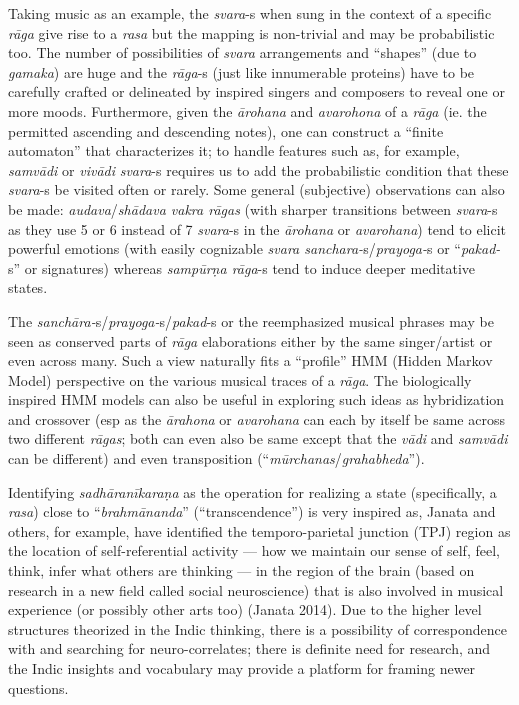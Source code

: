 Taking music as an example, the \textsl{svara}-s when sung in the context of a specific \textsl{rāga} give rise to a \textsl{rasa} but the mapping is non-trivial and may be probabilistic too. The number of possibilities of \textsl{svara} arrangements and “shapes” (due to \textsl{gamaka}) are huge and the \textsl{rāga}-s (just like innumerable proteins) have to be carefully crafted or delineated by inspired singers and composers to reveal one or more moods. Furthermore, given the \textsl{ārohana} and \textsl{avarohona} of a \textsl{rāga} (ie. the permitted ascending and descending notes), one can construct a “finite automaton” that characterizes it; to handle features such as, for example, \textsl{samvādi} or \textsl{vivādi} \textsl{svara}-s requires us to add the probabilistic condition that these \textsl{svara}-s be visited often or rarely. Some general (subjective) observations can also be made: \textsl{audava}/\textsl{shādava vakra rāgas} (with sharper transitions between \textsl{svara}-s as they use 5 or 6 instead of 7 \textsl{svara}-s in the \textsl{ārohana} or \textsl{avarohana}) tend to elicit powerful emotions (with easily cognizable \textsl{svara sanchara-}s/\textsl{prayoga-}s or “\textsl{pakad-}s” or signatures) whereas \textsl{sampūrṇa rāga}-s tend to induce deeper meditative states.

The \textsl{sanchāra-}s/\textsl{prayoga-}s/\textsl{pakad}-s or the reemphasized musical phrases may be seen as conserved parts of \textsl{rāga} elaborations either by the same singer/artist or even across many. Such a view naturally fits a “profile” HMM (Hidden Markov Model) perspective on the various musical traces of a \textsl{rāga}. The biologically inspired HMM models can also be useful in exploring such ideas as hybridization and crossover (esp as the \textsl{ārahona} or \textsl{avarohana} can each by itself be same across two different \textsl{rāgas}; both can even also be same except that the \textsl{vādi} and \textsl{samvādi} can be different) and even transposition (“\textsl{mūrchanas}/\textsl{grahabheda}”).

Identifying \textsl{sadhāranīkaraṇa} as the operation for realizing a state (specifically, a \textsl{rasa}) close to “\textsl{brahmānanda}” (“transcendence”) is very inspired as, Janata and others, for example, have identified the temporo-parietal junction (TPJ) region as the location of self-referential activity — how we maintain our sense of self, feel, think, infer what others are thinking — in the region of the brain (based on research in a new field called social neuroscience) that is also involved in musical experience (or possibly other arts too) (Janata 2014). Due to the higher level structures theorized in the Indic thinking, there is a possibility of correspondence with and searching for neuro-correlates; there is definite need for research, and the Indic insights and vocabulary may provide a platform for framing newer questions.

